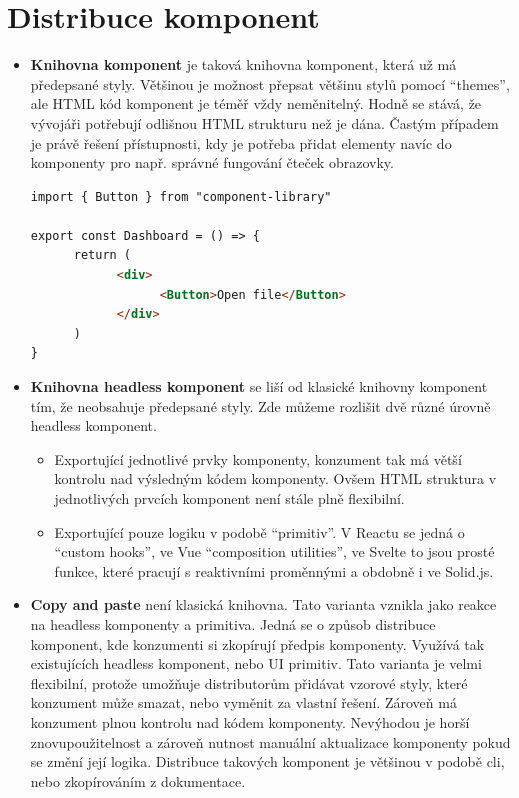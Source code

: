 \section{Distribuce komponent}

\begin{itemize}
      \item \textbf{Knihovna komponent} je taková knihovna komponent, která už má předepsané styly. Většinou je možnost přepsat většinu stylů pomocí ``themes'', ale HTML kód komponent je téměř vždy neměnitelný.
            Hodně se stává, že vývojáři potřebují odlišnou HTML strukturu než je dána.
            Častým případem je právě řešení přístupnosti, kdy je potřeba přidat elementy navíc do komponenty pro např. správné fungování čteček obrazovky.
            \begin{lstlisting}[caption={Ukázka použití komponentové knihovny}, label={component-distribution}, language=html]
import { Button } from "component-library"

export const Dashboard = () => {
      return (
            <div>
                  <Button>Open file</Button>
            </div>
      )
}
\end{lstlisting}
      \item \textbf{Knihovna headless komponent} se liší od klasické knihovny komponent tím, že neobsahuje předepsané styly.
            Zde můžeme rozlišit dvě různé úrovně headless komponent.
            \begin{itemize}
                  \item Exportující jednotlivé prvky komponenty, konzument tak má větší kontrolu nad výsledným kódem komponenty.
                        Ovšem HTML struktura v jednotlivých prvcích komponent není stále plně flexibilní.
                  \item Exportující pouze logiku v podobě ``primitiv''. V Reactu se jedná o ``custom hooks'', ve Vue ``composition utilities'', ve Svelte to jsou prosté funkce, které pracují s reaktivními proměnnými a obdobně i ve Solid.js.
            \end{itemize}
      \item \textbf{Copy and paste} není klasická knihovna.
            Tato varianta vznikla jako reakce na headless komponenty a primitiva.
            Jedná se o způsob distribuce komponent, kde konzumenti si zkopírují předpis komponenty.
            Využívá tak existujících headless komponent, nebo UI primitiv.
            Tato varianta je velmi flexibilní, protože umožňuje distributorům přidávat vzorové styly, které konzument může smazat, nebo vyměnit za vlastní řešení.
            Zároveň má konzument plnou kontrolu nad kódem komponenty.
            Nevýhodou je horší znovupoužitelnost a zároveň nutnost manuální aktualizace komponenty pokud se změní její logika.
            Distribuce takových komponent je většinou v podobě \gls{cli}, nebo zkopírováním z dokumentace.
\end{itemize}

